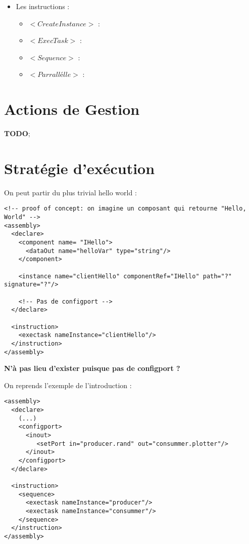 \documentclass{article}
\begin{document}
\begin{itemize}
    \item Les instructions :
    \begin{itemize}
        \item $<CreateInstance>$ :\\
        \item $<ExecTask>$ :\\
        \item $<Sequence>$ :\\
        \item $<Parrallélle>$ :\\
    \end{itemize}
\end{itemize}




\pagebreak




\section{Actions de Gestion}
\textbf{TODO};

\section{Stratégie d'exécution}
On peut partir du plus trivial hello world :
\begin{verbatim}
<!-- proof of concept: on imagine un composant qui retourne "Hello, World" -->
<assembly>
  <declare>
    <component name= "IHello">
      <dataOut name="helloVar" type="string"/>
    </component>

    <instance name="clientHello" componentRef="IHello" path="?" signature="?"/>

    <!-- Pas de configport -->
  </declare>

  <instruction>
    <exectask nameInstance="clientHello"/>
  </instruction>
</assembly>
\end{verbatim}
\textbf{N'à pas lieu d'exister puisque pas de configport ?}


\newpage


On reprends l'exemple de l'introduction :
\begin{verbatim}
<assembly>
  <declare>
    (...)
    <configport>
      <inout>
         <setPort in="producer.rand" out="consummer.plotter"/>
      </inout>
    </configport>
  </declare>

  <instruction>
    <sequence>
      <exectask nameInstance="producer"/>
      <exectask nameInstance="consummer"/>
    </sequence>
  </instruction>
</assembly>
\end{verbatim}
\end{document}
